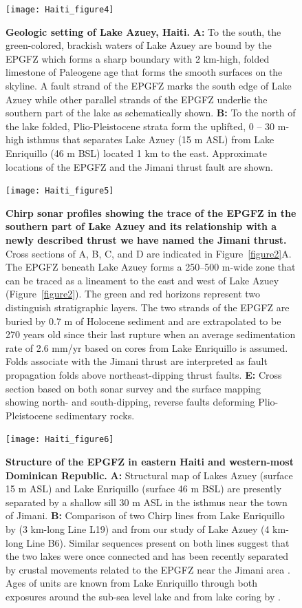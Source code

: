 \documentclass[linenumbers,draft]{agujournal}
\begin{document}
\begin{figure}
\centering
\texttt{[image: Haiti\_figure4]}
\caption{\textbf{Geologic setting of Lake Azuey, Haiti.} \textbf{A:} To the south, the green-colored, brackish waters of Lake Azuey are bound by the EPGFZ which forms a sharp boundary with 2 km-high, folded limestone of Paleogene age that forms the smooth surfaces on the skyline. A fault strand of the EPGFZ marks the south edge of Lake Azuey while other parallel strands of the EPGFZ underlie the southern part of the lake as schematically shown. \textbf{B:} To the north of the lake folded, Plio-Pleistocene strata form the uplifted, 0 -- 30 m-high isthmus that separates Lake Azuey (15 m ASL) from Lake Enriquillo (46 m BSL) located 1 km to the east. Approximate locations of the EPGFZ and the Jimani thrust fault are shown.}
\label{figure4}
\end{figure}

\begin{figure}
\centering
\texttt{[image: Haiti\_figure5]}
\caption{\textbf{Chirp sonar profiles showing the trace of the EPGFZ in the southern part of Lake Azuey and its relationship with a newly described thrust we have named the Jimani thrust.} Cross sections of A, B, C, and D are indicated in Figure~\ref{figure2}A. The EPGFZ beneath Lake Azuey forms a 250--500 m-wide zone that can be traced as a lineament to the east and west of Lake Azuey (Figure~\ref{figure2}). The green and red horizons represent two distinguish stratigraphic layers. The two strands of the EPGFZ are buried by 0.7 m of Holocene sediment and are extrapolated to be 270 years old since their last rupture when an average sedimentation rate of 2.6 mm/yr based on cores from Lake Enriquillo is assumed. Folds associate with the Jimani thrust are interpreted as fault propagation folds above northeast-dipping thrust faults. \textbf{E:} Cross section based on both sonar survey and the surface mapping \citep{mann1991overview} showing north- and south-dipping, reverse faults deforming Plio-Pleistocene sedimentary rocks.}
\label{figure5}
\end{figure}

\begin{figure}
\centering
\texttt{[image: Haiti\_figure6]}
\caption{\textbf{Structure of the EPGFZ in eastern Haiti and western-most Dominican Republic.} \textbf{A:} Structural map of Lakes Azuey (surface 15 m ASL) and Lake Enriquillo (surface 46 m BSL) are presently separated by a shallow sill 30 m ASL in the isthmus near the town of Jimani. \textbf{B:} Comparison of two Chirp lines from Lake Enriquillo by \citet{rios2013holocene} (3 km-long Line L19) and from our study of Lake Azuey (4 km-long Line B6). Similar sequences present on both lines suggest that the two lakes were once connected and has been recently separated by crustal movements related to the EPGFZ near the Jimani area \citep{greer2006decadal,medley2007paleosalinity,rios2013holocene}. Ages of units are known from Lake Enriquillo through both exposures around the sub-sea level lake and from lake coring by \citet{rios2013holocene}.}
\label{figure6}
\end{figure}
\end{document}
